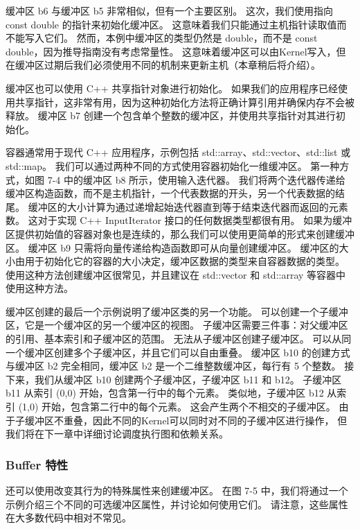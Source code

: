 缓冲区 b6 与缓冲区 b5 非常相似，但有一个主要区别。 这次，我们使用指向 const double 的指针来初始化缓冲区。 
这意味着我们只能通过主机指针读取值而不能写入它们。 
然而，本例中缓冲区的类型仍然是 double，而不是 const double，因为推导指南没有考虑常量性。 
这意味着缓冲区可以由Kernel写入，但在缓冲区过期后我们必须使用不同的机制来更新主机（本章稍后将介绍）。

缓冲区也可以使用 C++ 共享指针对象进行初始化。 
如果我们的应用程序已经使用共享指针，这非常有用，因为这种初始化方法将正确计算引用并确保内存不会被释放。 
缓冲区 b7 创建一个包含单个整数的缓冲区，并使用共享指针对其进行初始化。

容器通常用于现代 C++ 应用程序，示例包括 std::array、std::vector、std::list 或 std::map。 
我们可以通过两种不同的方式使用容器初始化一维缓冲区。 第一种方式，如图 7-4 中的缓冲区 b8 所示，使用输入迭代器。 
我们将两个迭代器传递给缓冲区构造函数，而不是主机指针，一个代表数据的开头，另一个代表数据的结尾。 
缓冲区的大小计算为通过递增起始迭代器直到等于结束迭代器而返回的元素数。 
这对于实现 C++ InputIterator 接口的任何数据类型都很有用。 
如果为缓冲区提供初始值的容器对象也是连续的，那么我们可以使用更简单的形式来创建缓冲区。 
缓冲区 b9 只需将向量传递给构造函数即可从向量创建缓冲区。 
缓冲区的大小由用于初始化它的容器的大小决定，缓冲区数据的类型来自容器数据的类型。 
使用这种方法创建缓冲区很常见，并且建议在 std::vector 和 std::array 等容器中使用这种方法。

缓冲区创建的最后一个示例说明了缓冲区类的另一个功能。 可以创建一个子缓冲区，它是一个缓冲区的另一个缓冲区的视图。
 子缓冲区需要三件事：对父缓冲区的引用、基本索引和子缓冲区的范围。 无法从子缓冲区创建子缓冲区。 
 可以从同一个缓冲区创建多个子缓冲区，并且它们可以自由重叠。 
 缓冲区 b10 的创建方式与缓冲区 b2 完全相同，缓冲区 b2 是一个二维整数缓冲区，每行有 5 个整数。 
 接下来，我们从缓冲区 b10 创建两个子缓冲区，子缓冲区 b11 和 b12。 
 子缓冲区 b11 从索引 (0,0) 开始，包含第一行中的每个元素。 
 类似地，子缓冲区 b12 从索引 (1,0) 开始，包含第二行中的每个元素。 
 这会产生两个不相交的子缓冲区。 由于子缓冲区不重叠，因此不同的Kernel可以同时对不同的子缓冲区进行操作，
 但我们将在下一章中详细讨论调度执行图和依赖关系。

\subsubsection{Buffer 特性}

还可以使用改变其行为的特殊属性来创建缓冲区。 
在图 7-5 中，我们将通过一个示例介绍三个不同的可选缓冲区属性，并讨论如何使用它们。 
请注意，这些属性在大多数代码中相对不常见。


